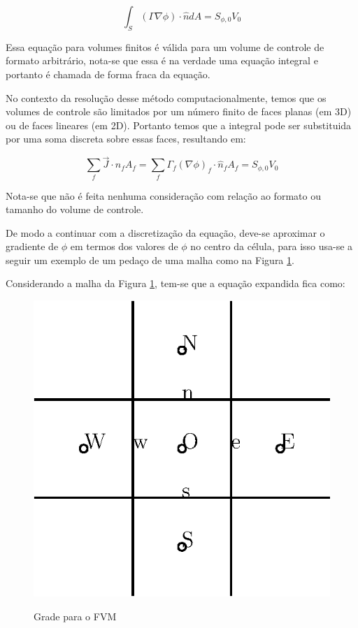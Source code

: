 \begin{equation}
    \int_S (\Gamma \nabla \phi) \cdot \hat{n} dA = S_{\phi,0} V_0
\end{equation}

Essa equação para volumes finitos é válida para um volume de controle de formato arbitrário, nota-se que essa é na verdade uma equação integral e portanto é chamada de forma fraca da equação.

No contexto da resolução desse método computacionalmente, temos que os volumes de controle são limitados por um número finito de faces planas (em 3D) ou de faces lineares (em 2D). Portanto temos que a integral pode ser substituida por uma soma discreta sobre essas faces, resultando em:

\begin{equation}
    \sum_f \vec{J} \cdot \hat{n}_f A_f = \sum_f \Gamma_f (\nabla \phi)_f \cdot \hat{n}_f A_f = S_{\phi,0} V_0
\end{equation}

Nota-se que não é feita nenhuma consideração com relação ao formato ou tamanho do volume de controle.

De modo a continuar com a discretização da equação, deve-se aproximar o gradiente de $\phi$ em termos dos valores de $\phi$ no centro da célula, para isso usa-se a seguir um exemplo de um pedaço de uma malha como na Figura \ref{fig:fig1}.

Considerando a malha da Figura \ref{fig:fig1}, tem-se que a equação expandida fica como:

\begin{figure}
    \centering
    \caption{Grade para o FVM}
    \includegraphics{fig/Figura1}
    \label{fig:fig1}    
\end{figure}


